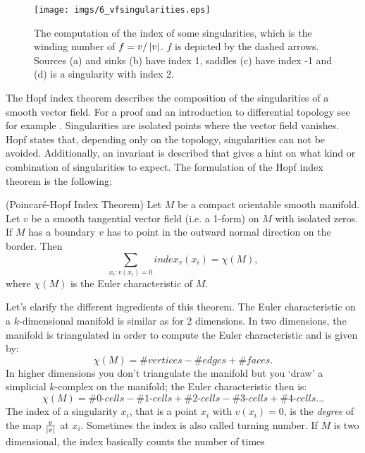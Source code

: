 

\begin{figure}%
\begin{center}
\texttt{[image: imgs/6\_vfsingularities.eps]}%
\end{center}
\caption{The computation of the index of some singularities, which is the winding number of $f = v / \left| v \right|$. $f$ is depicted by the dashed arrows. Sources (a) and sinks (b) have index 1, saddles (c) have index -1 and (d) is a singularity with index 2. }%
\label{fig:vfsingularities}%
\end{figure}

The Hopf index theorem describes the composition of the singularities of a smooth vector field. For a proof and an introduction to differential topology see for example \cite{guillemin1974differential}. Singularities are isolated points where the vector field vanishes. Hopf states that, depending only on the topology, singularities can not be avoided. Additionally, an invariant is described that gives a hint on what kind or combination of singularities to expect. 
The formulation of the Hopf index theorem is the following:
\begin{thm}(Poincar\'e-Hopf Index Theorem) Let $M$ be a compact orientable smooth manifold. Let $v$ be a smooth tangential vector field (i.e. a 1-form) on $M$ with isolated zeros. If $M$ has a boundary $v$ has to point in the outward normal direction on the border. Then
\[\sum_{x_i: v(x_i) = 0} index_v(x_i) = \chi(M),\]
where $\chi(M)$ is the Euler characteristic of $M$.
\end{thm}
Let's clarify the different ingredients of this theorem. The Euler characteristic on a $k$-dimensional manifold is similar as for 2 dimensions. In two dimensions, the manifold is triangulated in order to compute the Euler characteristic and is given by:
\[\chi(M) = \#vertices - \# edges + \# faces.\]
In higher dimensions you don't triangulate the manifold but you `draw' a simplicial $k$-complex on the manifold; the Euler characteristic then is:
\[\chi(M) = \# \textit{0-cells} - \# \textit{1-cells} + \# \textit{2-cells} - \# \textit{3-cells} + \# \textit{4-cells}...\]
The index of a singularity $x_i$, that is a point $x_i$ with $v(x_i) = 0$, is the \emph{degree} of the map $\frac{v}{\left| v \right|}$ at $x_i$. Sometimes the index is also called turning number. If $M$ is two dimensional, the index basically counts the number of times 
